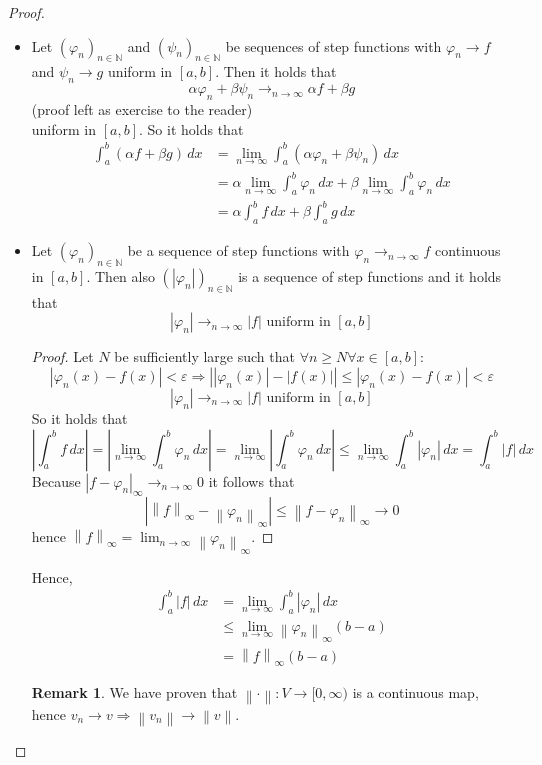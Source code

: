 \documentclass[a4paper,landscape,twocolumn]{article}
\theoremstyle{definition}
\newtheorem{rem}{Remark}
\newcommand\abs[1]{\left|#1\right|}
\newcommand\seq[1]{{\left(#1\right)}_{n \in \mathbb N}}
\newcommand\norm[1]{\left\|#1\right\|}
\newcommand\inorm[1]{\left\|#1\right\|_\infty}
\begin{document}
\begin{proof}
  \begin{itemize}
    \item Let $\seq{\varphi_n}$ and $\seq{\psi_n}$ be sequences of step functions
      with $\varphi_n \to f$ and $\psi_n \to g$ uniform in $[a,b]$.
      Then it holds that
      \[ \alpha \varphi_n + \beta \psi_n \to_{n\to\infty} \alpha f + \beta g \]
      (proof left as exercise to the reader) \\
      uniform in $[a,b]$. So it holds that
      \begin{align*}
        \int_a^b (\alpha f + \beta g) \, dx
          &= \lim_{n\to\infty} \int_a^b (\alpha \varphi_n + \beta \psi_n) \, dx \\
          &= \alpha \lim_{n\to\infty} \int_a^b \varphi_n \, dx + \beta \lim_{n\to\infty} \int_a^b \varphi_n \, dx \\
          &= \alpha \int_a^b f \, dx + \beta \int_a^b g \, dx
      \end{align*}
    \item
      Let $\seq{\varphi_n}$ be a sequence of step functions with $\varphi_n \to_{n\to\infty} f$ continuous
      in $[a,b]$. Then also $\seq{\abs{\varphi_n}}$ is a sequence of step functions and it holds that
      \[ \abs{\varphi_n} \to_{n\to\infty} \abs{f} \text{ uniform in } [a,b] \]
      \begin{proof}
        Let $N$ be sufficiently large such that $\forall n \geq N \forall x \in [a,b]:$
        \[
          \abs{\varphi_n(x) - f(x)} < \varepsilon
          \Rightarrow \abs{\abs{\varphi_n(x)} - \abs{f(x)}} \leq \abs{\varphi_n(x) - f(x)} < \varepsilon
        \] \[
          \abs{\varphi_n} \to_{n\to\infty} \abs{f} \text{ uniform in } [a,b]
        \]
        So it holds that
        \[
          \abs{\int_a^b f \, dx}
          = \abs{\lim_{n\to\infty} \int_a^b \varphi_n \, dx}
          = \lim_{n\to\infty} \abs{\int_a^b \varphi_n \, dx}
          \leq \lim_{n\to\infty} \int_a^b \abs{\varphi_n} \, dx
          = \int_a^b \abs{f} \, dx
        \]
        Because $\abs{f - \varphi_n}_\infty \to_{n\to\infty} 0$ it follows that
        \[ \abs{\inorm{f} - \inorm{\varphi_n}} \leq \inorm{f - \varphi_n} \to 0 \]
        hence $\inorm{f} = \lim_{n\to\infty} \inorm{\varphi_n}$.
      \end{proof}
      Hence,
      \begin{align*}
        \int_a^b \abs{f} \, dx
          &= \lim_{n \to \infty} \int_a^b \abs{\varphi_n} \, dx \\
          &\leq \lim_{n\to\infty} \inorm{\varphi_n} (b - a) \\
          &= \inorm{f} (b - a)
      \end{align*}
      \begin{rem}
        We have proven that $\norm{\cdot}: V \to [0,\infty)$ is a continuous
        map, hence $v_n \to v \Rightarrow \norm{v_n} \to \norm{v}$.
      \end{rem}
  \end{itemize}
\end{proof}
\end{document}
